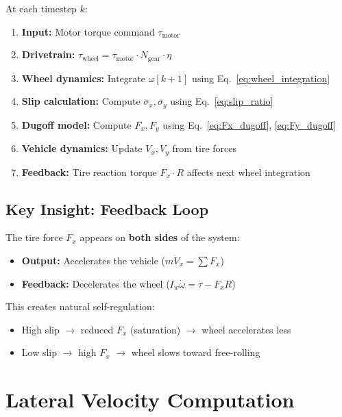 \documentclass[11pt,a4paper]{article}
\begin{document}
At each timestep $k$:

\begin{enumerate}
    \item \textbf{Input:} Motor torque command $\tau_{\text{motor}}$
    \item \textbf{Drivetrain:} $\tau_{\text{wheel}} = \tau_{\text{motor}} \cdot N_{\text{gear}} \cdot \eta$
    \item \textbf{Wheel dynamics:} Integrate $\omega[k+1]$ using Eq.~\ref{eq:wheel_integration}
    \item \textbf{Slip calculation:} Compute $\sigma_x, \sigma_y$ using Eq.~\ref{eq:slip_ratio}
    \item \textbf{Dugoff model:} Compute $F_x, F_y$ using Eq.~\ref{eq:Fx_dugoff}, \ref{eq:Fy_dugoff}
    \item \textbf{Vehicle dynamics:} Update $V_x, V_y$ from tire forces
    \item \textbf{Feedback:} Tire reaction torque $F_x \cdot R$ affects next wheel integration
\end{enumerate}

\subsection{Key Insight: Feedback Loop}

The tire force $F_x$ appears on \textbf{both sides} of the system:
\begin{itemize}
    \item \textbf{Output:} Accelerates the vehicle ($m\dot{V}_x = \sum F_x$)
    \item \textbf{Feedback:} Decelerates the wheel ($I_w \dot{\omega} = \tau - F_x R$)
\end{itemize}

This creates natural self-regulation:
\begin{itemize}
    \item High slip $\rightarrow$ reduced $F_x$ (saturation) $\rightarrow$ wheel accelerates less
    \item Low slip $\rightarrow$ high $F_x$ $\rightarrow$ wheel slows toward free-rolling
\end{itemize}

\section{Lateral Velocity Computation}
\end{document}
